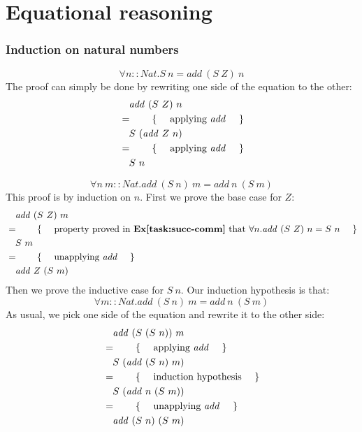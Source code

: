 \section{Equational reasoning}

\subsubsection{Induction on natural numbers}

\begin{displaymath}
\forall n :: \mathit{Nat} . S~n = \mathit{add}~(S~Z)~n
\end{displaymath}
The proof can simply be done by rewriting one side of the equation to the other:
\begin{align*}
&\quad \mathit{add}~(S~Z)~n\\
&=\qquad\text{\{\quad\ applying $\mathit{add}$ \quad\}}\\
&\quad S~(\mathit{add}~Z~n)\\
&=\qquad\text{\{\quad\ applying $\mathit{add}$ \quad\}}\\
&\quad S~n
\end{align*}

\begin{displaymath}
\forall n~m :: \mathit{Nat} . \mathit{add}~(S~n)~m = \mathit{add}~n~(S~m)
\end{displaymath}
This proof is by induction on $n$. First we prove the base case for $Z$:
\begin{align*}
&\quad \mathit{add}~(S~Z)~m\\
&=\qquad\text{\{\quad\ property proved in \textbf{Ex\ref{task:succ-comm}} that $\forall n.\mathit{add}~(S~Z)~n=S~n$ \quad\}}\\
&\quad S~m\\
&=\qquad\text{\{\quad\ unapplying $\mathit{add}$ \quad\}}\\
&\quad \mathit{add}~Z~(S~m)
\end{align*}
Then we prove the inductive case for $S~n$. Our induction hypothesis is that:
\begin{displaymath}
\forall m :: \mathit{Nat} . \mathit{add}~(S~n)~m = \mathit{add}~n~(S~m)
\end{displaymath}
As usual, we pick one side of the equation and rewrite it to the other side:
\begin{align*}
&\quad \mathit{add}~(S~(S~n))~m\\
&=\qquad\text{\{\quad\ applying $\mathit{add}$ \quad\}}\\
&\quad S~(\mathit{add}~(S~n)~m)\\
&=\qquad\text{\{\quad\ induction hypothesis \quad\}}\\
&\quad S~(\mathit{add}~n~(S~m))\\
&=\qquad\text{\{\quad\ unapplying $\mathit{add}$ \quad\}}\\
&\quad \mathit{add}~(S~n)~(S~m)
\end{align*}

